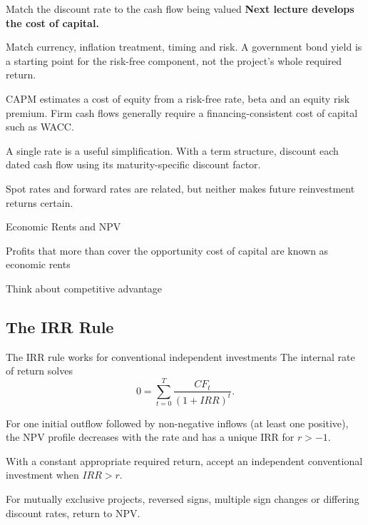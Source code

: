 \documentclass[9pt,aspectratio=169]{beamer}
\newenvironment{wideitemize}{\itemize\addtolength{\itemsep}{10pt}}{\enditemize}
\begin{document}
\begin{frame}{Match the discount rate to the cash flow being valued}
\textbf{Next lecture develops the cost of capital.}
\begin{wideitemize}
\item Match currency, inflation treatment, timing and risk. A government bond yield is a starting point for the risk-free component, not the project's whole required return.
\item CAPM estimates a cost of equity from a risk-free rate, beta and an equity risk premium. Firm cash flows generally require a financing-consistent cost of capital such as WACC.
\item A single rate is a useful simplification. With a term structure, discount each dated cash flow using its maturity-specific discount factor.
\item Spot rates and forward rates are related, but neither makes future reinvestment returns certain.
\end{wideitemize}
\end{frame}

\begin{frame}{Economic Rents and NPV}
\begin{wideitemize}
\item Profits that more than cover the opportunity cost of capital are known as economic rents
\item Think about competitive advantage
\end{wideitemize}
\end{frame}

\subsection{The IRR Rule}

\begin{frame}{The IRR rule works for conventional independent investments}
The internal rate of return solves
\[0=\sum_{t=0}^{T}\frac{CF_t}{(1+IRR)^t}.\]
\begin{wideitemize}
\item For one initial outflow followed by non-negative inflows (at least one positive), the NPV profile decreases with the rate and has a unique IRR for $r>-1$.
\item With a constant appropriate required return, accept an independent conventional investment when $IRR>r$.
\item For mutually exclusive projects, reversed signs, multiple sign changes or differing discount rates, return to NPV.
\end{wideitemize}
\end{frame}
\end{document}
